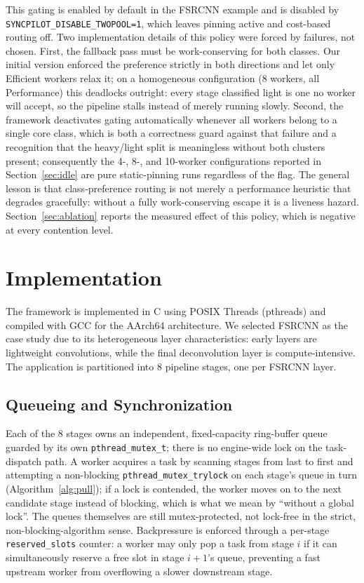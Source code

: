 \documentclass[conference]{IEEEtran}
\begin{document}
This gating is enabled by default in the FSRCNN example and is disabled by \texttt{SYNCPILOT\_DISABLE\_TWOPOOL=1}, which leaves pinning active and cost-based routing off. Two implementation details of this policy were forced by failures, not chosen. First, the fallback pass must be work-conserving for both classes. Our initial version enforced the preference strictly in both directions and let only Efficient workers relax it; on a homogeneous configuration (8 workers, all Performance) this deadlocks outright: every stage classified light is one no worker will accept, so the pipeline stalls instead of merely running slowly. Second, the framework deactivates gating automatically whenever all workers belong to a single core class, which is both a correctness guard against that failure and a recognition that the heavy/light split is meaningless without both clusters present; consequently the 4-, 8-, and 10-worker configurations reported in Section~\ref{sec:idle} are pure static-pinning runs regardless of the flag. The general lesson is that class-preference routing is not merely a performance heuristic that degrades gracefully: without a fully work-conserving escape it is a liveness hazard. Section~\ref{sec:ablation} reports the measured effect of this policy, which is negative at every contention level.

\section{Implementation}
\label{sec:implementation}
The framework is implemented in C using POSIX Threads (pthreads) and compiled with GCC for the AArch64 architecture. We selected FSRCNN as the case study due to its heterogeneous layer characteristics: early layers are lightweight convolutions, while the final deconvolution layer is compute-intensive. The application is partitioned into 8 pipeline stages, one per FSRCNN layer.

\subsection{Queueing and Synchronization}
Each of the 8 stages owns an independent, fixed-capacity ring-buffer queue guarded by its own \texttt{pthread\_mutex\_t}; there is no engine-wide lock on the task-dispatch path. A worker acquires a task by scanning stages from last to first and attempting a non-blocking \texttt{pthread\_mutex\_trylock} on each stage's queue in turn (Algorithm~\ref{alg:pull}); if a lock is contended, the worker moves on to the next candidate stage instead of blocking, which is what we mean by ``without a global lock''. The queues themselves are still mutex-protected, not lock-free in the strict, non-blocking-algorithm sense. Backpressure is enforced through a per-stage \texttt{reserved\_slots} counter: a worker may only pop a task from stage $i$ if it can simultaneously reserve a free slot in stage $i{+}1$'s queue, preventing a fast upstream worker from overflowing a slower downstream stage.
\end{document}
